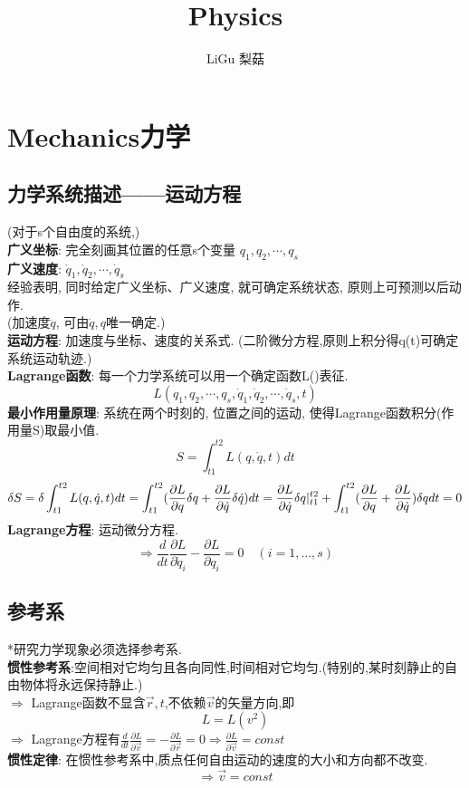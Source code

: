 \documentclass{article}
\title{Physics}\author{LiGu 梨菇}\date{}
\begin{document}
\maketitle

\section{Mechanics力学}
\subsection{力学系统描述——运动方程}
(对于s个自由度的系统,)\\
\textbf{广义坐标}: 完全刻画其位置的任意s个变量 $q_{1},q_{2},\cdots,q_{s}$\\
\textbf{广义速度}: $\dot q_{1},\dot q_{2},\cdots,\dot q_{s}$\\
经验表明, 同时给定广义坐标、广义速度, 就可确定系统状态, 原则上可预测以后动作.\\
(加速度$\ddot q$, 可由$\dot q,q$唯一确定.)\\
\textbf{运动方程}: 加速度与坐标、速度的关系式. (二阶微分方程,原则上积分得q(t)可确定系统运动轨迹.)\\
\textbf{Lagrange函数}: 每一个力学系统可以用一个确定函数L()表征.
\[L(q_{1},q_{2},\cdots,q_{s},\dot q_{1},\dot q_{2},\cdots,\dot q_{s},t)\]
\textbf{最小作用量原理}: 系统在两个时刻的, 位置之间的运动, 使得Lagrange函数积分(作用量S)取最小值.
\[S = \int_{t1}^{t2} L(q,\dot q,t)dt\]
\[\delta S = \delta \int_{t1}^{t2} L(q,\dot q,t)dt
 = \int_{t1}^{t2} (\frac{\partial L}{\partial q}\delta q + \frac{\partial L}{\partial \dot q}\delta \dot q) dt
 = \frac{\partial L}{\partial \dot q} \delta q \arrowvert_{t1}^{t2}
 + \int_{t1}^{t2} (\frac{\partial L}{\partial q} + \frac{\partial L}{\partial \dot q}) \delta q dt
 = 0\]
\textbf{Lagrange方程}: 运动微分方程. 
\[\Rightarrow \frac{d}{dt}\frac{\partial L}{\partial \dot q_i} - \frac{\partial L}{\partial q_i} = 0\quad(i=1,\dots,s)\]


\subsection{参考系}
*研究力学现象必须选择参考系.\\
\textbf{惯性参考系}:空间相对它均匀且各向同性,时间相对它均匀.(特别的,某时刻静止的自由物体将永远保持静止.)\\
$\Rightarrow$ Lagrange函数不显含$\vec r,t$,不依赖$\vec v$的矢量方向,即
\[L = L(v^2)\]
$\Rightarrow$ Lagrange方程有$\frac{d}{dt}\frac{\partial L}{\partial \vec v} = -\frac{\partial L}{\partial \vec r} = 0 \Rightarrow \frac{\partial L}{\partial \vec v}=const$\\
\textbf{惯性定律}: 在惯性参考系中,质点任何自由运动的速度的大小和方向都不改变.
\[\Rightarrow \vec v = const\]
\end{document}

